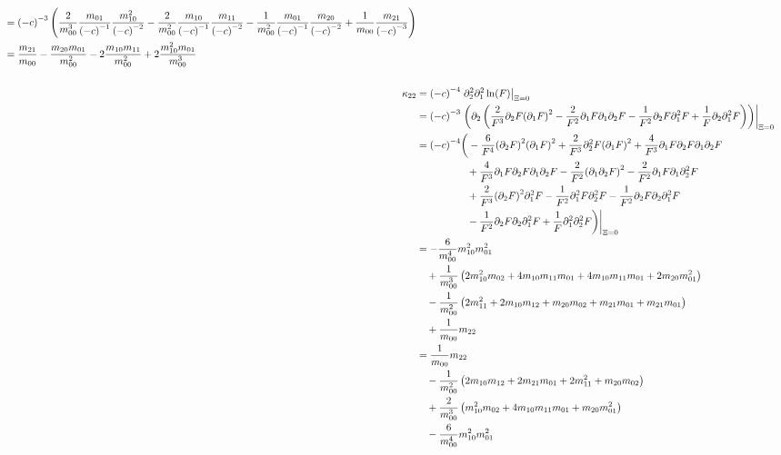 \documentclass{article}
\begin{document}
\begin{align*}
\begin{aligned}
  & = {(-c)}^{-3} \left(
      \frac{2}{m_{00}^3} \frac{m_{01}}{{(-c)}^{-1}} \frac{m_{10}^2}{{(-c)}^{-2}}
    - \frac{2}{m_{00}^2} \frac{m_{10}}{{(-c)}^{-1}} \frac{m_{11}}{{(-c)}^{-2}}
    - \frac{1}{m_{00}^2} \frac{m_{01}}{{(-c)}^{-1}} \frac{m_{20}}{{(-c)}^{-2}}
    + \frac{1}{m_{00}}   \frac{m_{21}}{{(-c)}^{-3}}
    \right)\\
  & = \frac{m_{21}}{m_{00}} - \frac{m_{20}m_{01}}{m_{00}^2}
       - 2\frac{m_{10}m_{11}}{m_{00}^2} + 2\frac{m_{10}^2 m_{01}}{m_{00}^3}
  \end{aligned}\\
  \\
  &\begin{aligned}
  \nonumber
  \mathllap{\kappa_{22}} & = {(-c)}^{-4} \left. \partial_2^2 \partial_1^2 \ln(F) \right|_{\Xi = 0} \\
  & = {(-c)}^{-3} \left.\left(\partial_2\left(
      \frac{2}{F^3} \partial_2 F {(\partial_1 F)}^2
    - \frac{2}{F^2} \partial_1 F \partial_1 \partial_2 F
    - \frac{1}{F^2} \partial_2 F \partial_1^2 F
    + \frac{1}{F} \partial_2 \partial_1^2 F
    \right)\right)\right|_{\Xi = 0}\\
  & = {(-c)}^{-4} \bigg(
    - \frac{6}{F^4} {(\partial_2 F)}^2 {(\partial_1 F)}^2
    + \frac{2}{F^3} \partial_2^2 F {(\partial_1 F)}^2
    + \frac{4}{F^3} \partial_1 F \partial_2 F \partial_1 \partial_2 F \\
  & \qquad\qquad\quad
    + \frac{4}{F^3} \partial_1 F \partial_2 F \partial_1 \partial_2 F
    - \frac{2}{F^2} {(\partial_1 \partial_2 F)}^2
    - \frac{2}{F^2} \partial_1 F \partial_1 \partial_2^2 F \\
  & \qquad\qquad\quad
    + \frac{2}{F^3} {(\partial_2 F)}^2  \partial_1^2 F
    - \frac{1}{F^2} \partial_1^2 F \partial_2^2 F
    - \frac{1}{F^2} \partial_2 F \partial_2 \partial_1^2 F \\
  & \qquad\qquad\quad
    - \frac{1}{F^2} \partial_2 F \partial_2 \partial_1^2 F
    + \frac{1}{F}   \partial_1^2 \partial_2^2 F
    \bigg)\bigg|_{\Xi = 0} \\
  & = -\frac{6}{m_{00}^4} m_{10}^2 m_{01}^2 \\
  &\quad
    + \frac{1}{m_{00}^3}
      \left(
        2 m_{10}^2 m_{02} + 4 m_{10}m_{11}m_{01}
        + 4 m_{10}m_{11}m_{01} + 2 m_{20}m_{01}^2
      \right) \\
  &\quad
    - \frac{1}{m_{00}^2}
      \left(
        2 m_{11}^2 + 2 m_{10}m_{12} + m_{20}m_{02} + m_{21}m_{01} + m_{21}m_{01}
      \right) \\
  &\quad
    + \frac{1}{m_{00}} m_{22}\\
  & = \frac{1}{m_{00}} m_{22} \\
    &\quad
    - \frac{1}{m_{00}^2}
    \left(
       2 m_{10}m_{12}  + 2 m_{21}m_{01} + 2 m_{11}^2 + m_{20}m_{02}
    \right) \\
    &\quad
    + \frac{2}{m_{00}^3}
      \left(
        m_{10}^2 m_{02} + 4 m_{10}m_{11}m_{01} + m_{20}m_{01}^2
      \right)\\
    &\quad
       - \frac{6}{m_{00}^4} m_{10}^2 m_{01}^2
  \end{aligned}
\end{align*}
\end{document}
